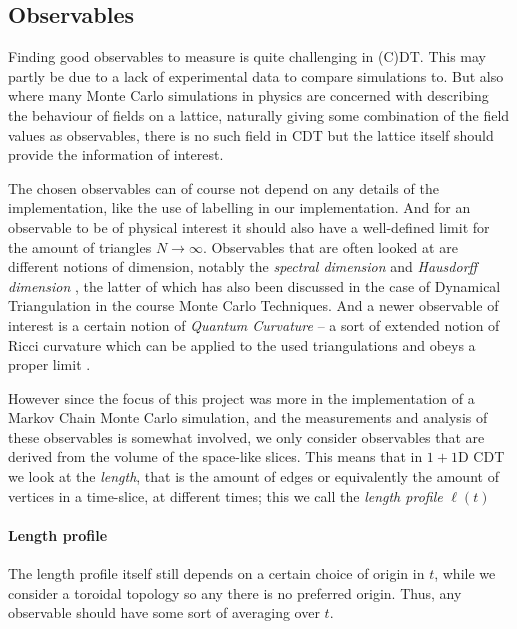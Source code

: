 \subsection{Observables} \label{sec:observables}
Finding good observables to measure is quite challenging in (C)DT. This may partly be due to a lack of experimental data to compare simulations to.
But also where many Monte Carlo simulations in physics are concerned with describing the behaviour of fields on a lattice, naturally giving some combination of the field values as observables,
there is no such field in CDT but the lattice itself should provide the information of interest.

The chosen observables can of course not depend on any details of the implementation, like the use of labelling in our implementation.
And for an observable to be of physical interest it should also have a well-defined limit for the amount of triangles $N \rightarrow \infty$.
Observables that are often looked at are different notions of dimension, notably the \emph{spectral dimension} \cite{2012} and \emph{Hausdorff dimension} \cite{1998, 2012}, the latter of which has also been discussed in the case of Dynamical Triangulation in the course Monte Carlo Techniques. And a newer observable of interest is a certain notion of \emph{Quantum Curvature} -- a sort of extended notion of Ricci curvature which can be applied to the used triangulations and obeys a proper limit \cite{brunekreef2021}.

However since the focus of this project was more in the implementation of a Markov Chain Monte Carlo simulation, and the measurements and analysis of these observables is somewhat involved, we only consider observables that are derived from the volume of the space-like slices.
This means that in $1 + 1$D CDT we look at the \emph{length}, that is the amount of edges or equivalently the amount of vertices in a time-slice, at different times; this we call the \emph{length profile} $\ell(t)$

\paragraph{Length profile}
The length profile itself still depends on a certain choice of origin in $t$, while we consider a toroidal topology so any there is no preferred origin. Thus, any observable should have some sort of averaging over $t$.

